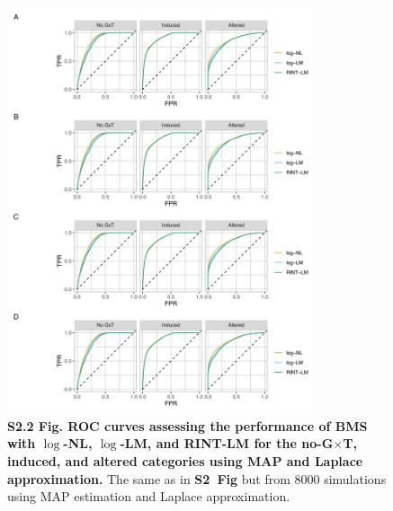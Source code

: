 \documentclass[11pt]{article}
\newcommand{\GxT}{G$\times$T\xspace}
\newcommand{\sfigroccmcmc}{\textbf{S2~Fig}\xspace}
\begin{document}
\begin{figure}[!ht]
\begin{center}
  \includegraphics[width=0.8\textwidth]{png/sim_rocc_map_lap.png}
\end{center}  
\caption{
  {\bf
    S2.2 Fig. ROC curves assessing the performance of BMS with $\log$-NL, $\log$-LM, and RINT-LM for the no-\GxT, induced, and altered categories using MAP and Laplace approximation.}
The same as in \sfigroccmcmc but from 8000 simulations using MAP estimation and Laplace approximation.
}
\label{s-fig:sim-rocc-map}
\end{figure}
\end{document}

